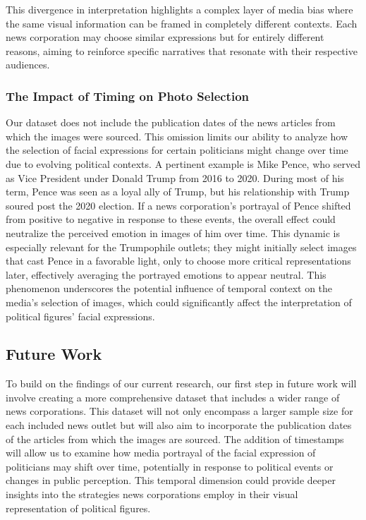 \documentclass[sigconf]{acmart}
\begin{document}
This divergence in interpretation highlights a complex layer of media bias where the same visual information can be framed in completely different contexts. Each news corporation may choose similar expressions but for entirely different reasons, aiming to reinforce specific narratives that resonate with their respective audiences. 



\subsubsection{The Impact of Timing on Photo Selection}

Our dataset does not include the publication dates of the news articles from which the images were sourced. This omission limits our ability to analyze how the selection of facial expressions for certain politicians might change over time due to evolving political contexts. A pertinent example is Mike Pence, who served as Vice President under Donald Trump from 2016 to 2020. During most of his term, Pence was seen as a loyal ally of Trump, but his relationship with Trump soured post the 2020 election. If a news corporation’s portrayal of Pence shifted from positive to negative in response to these events, the overall effect could neutralize the perceived emotion in images of him over time. This dynamic is especially relevant for the Trumpophile outlets; they might initially select images that cast Pence in a favorable light, only to choose more critical representations later, effectively averaging the portrayed emotions to appear neutral. This phenomenon underscores the potential influence of temporal context on the media's selection of images, which could significantly affect the interpretation of political figures' facial expressions.




\subsection{Future Work}


To build on the findings of our current research, our first step in future work will involve creating a more comprehensive dataset that includes a wider range of news corporations. This dataset will not only encompass a larger sample size for each included news outlet but will also aim to incorporate the publication dates of the articles from which the images are sourced. The addition of timestamps will allow us to examine how media portrayal of the facial expression of politicians may shift over time, potentially in response to political events or changes in public perception. This temporal dimension could provide deeper insights into the strategies news corporations employ in their visual representation of political figures.
\end{document}
